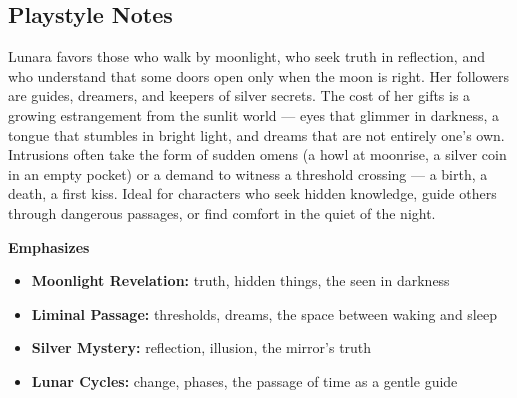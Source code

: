 \subsection*{Playstyle Notes}
Lunara favors those who walk by moonlight, who seek truth in reflection, and who understand that some doors open only when the moon is right. Her followers are guides, dreamers, and keepers of silver secrets. The cost of her gifts is a growing estrangement from the sunlit world --- eyes that glimmer in darkness, a tongue that stumbles in bright light, and dreams that are not entirely one's own. Intrusions often take the form of sudden omens (a howl at moonrise, a silver coin in an empty pocket) or a demand to witness a threshold crossing --- a birth, a death, a first kiss. Ideal for characters who seek hidden knowledge, guide others through dangerous passages, or find comfort in the quiet of the night.

\noindent\textbf{Emphasizes}
\begin{itemize}
  \item \textbf{Moonlight Revelation:} truth, hidden things, the seen in darkness
  \item \textbf{Liminal Passage:} thresholds, dreams, the space between waking and sleep
  \item \textbf{Silver Mystery:} reflection, illusion, the mirror's truth
  \item \textbf{Lunar Cycles:} change, phases, the passage of time as a gentle guide
\end{itemize}